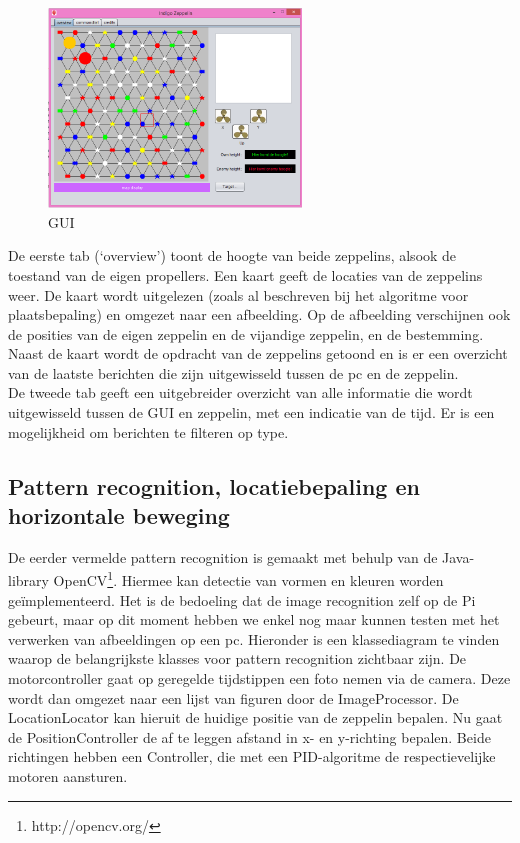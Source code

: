\documentclass[tt]{penoverslag}
\begin{document}
\begin{figure}[H]
\begin{center}
\includegraphics[width=0.6\textwidth]{GUI.png}
\end{center}
\caption{GUI}
\label{GUI}
\end{figure}

De eerste tab (`overview') toont de hoogte van beide zeppelins, alsook de toestand van de eigen propellers. Een kaart geeft de locaties van de zeppelins weer. De kaart wordt uitgelezen (zoals al beschreven bij het algoritme voor plaatsbepaling) en omgezet naar een afbeelding. Op de afbeelding verschijnen ook de posities van de eigen zeppelin en de vijandige zeppelin, en de bestemming. Naast de kaart wordt de opdracht van de zeppelins getoond en is er een overzicht van de laatste berichten die zijn uitgewisseld tussen de pc en de zeppelin. \\

De tweede tab geeft een uitgebreider overzicht van alle informatie die wordt uitgewisseld tussen de GUI en zeppelin, met een indicatie van de tijd. Er is een mogelijkheid om berichten te filteren op type. \\



\subsection{Pattern recognition, locatiebepaling en horizontale beweging}
De eerder vermelde pattern recognition is gemaakt met behulp van de Java-library OpenCV\footnote{http://opencv.org/}. Hiermee kan detectie van vormen en kleuren worden ge\"{i}mplementeerd. Het is de bedoeling dat de image recognition zelf op de Pi gebeurt, maar op dit moment hebben we enkel nog maar kunnen testen met het verwerken van afbeeldingen op een pc. Hieronder is een klassediagram te vinden waarop de belangrijkste klasses voor pattern recognition zichtbaar zijn. De motorcontroller gaat op geregelde tijdstippen een foto nemen via de camera. Deze wordt dan omgezet naar een lijst van figuren door de ImageProcessor. De LocationLocator kan hieruit de huidige positie van de zeppelin bepalen. Nu gaat de PositionController de af te leggen afstand in x- en y-richting bepalen. Beide richtingen hebben een Controller, die met een PID-algoritme de respectievelijke motoren aansturen.\\
\end{document}
